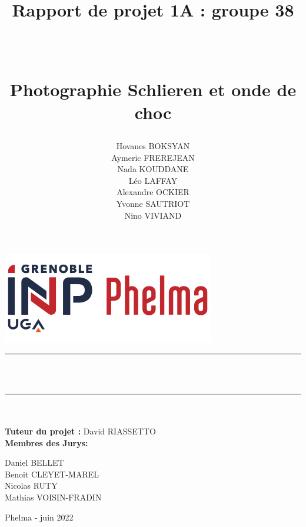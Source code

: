 \documentclass[12 pt, a4paper]{report}
\title{\begin{large} Rapport de projet 1A : groupe 38 \end{large}\\ [3ex]
\begin{Large}
	\textbf{Photographie Schlieren et onde de choc}
\end{Large}}
\author{Hovanes BOKSYAN \\
		Aymeric FREREJEAN \\
		Nada KOUDDANE \\
		Léo LAFFAY \\
		Alexandre OCKIER \\
		Yvonne SAUTRIOT \\
		Nino VIVIAND}
\newcommand{\tutor}{\textbf{Tuteur du projet :} David RIASSETTO}
\newcommand{\HRule}{\rule{\linewidth}{0.2mm}}
\begin{document}
	\begin{spacing}{1.15}
		\makeatletter
			\begin{titlepage}
				\includegraphics[scale = 0.5]{logo.jpeg}
				\vspace{1.5cm}
				\vfill
				\begin{center}
					\HRule \\ [2ex]
					{\@title }\\
					\HRule \\ [3ex]
					{\@author}\\ [5ex]
					{\tutor}\\[7ex]
					\textbf{Membres des Jurys:}\\
					\begin{multicols}{2}
						Daniel BELLET\\
						Benoit CLEYET-MAREL\\
						\columnbreak
						Nicolas RUTY\\
						Mathias VOISIN-FRADIN
					\end{multicols}
				\vfill
				\end{center}
			\raggedleft\vfill{Phelma - juin 2022}
			\end{titlepage}
		\makeatother
	\newpage
	\thispagestyle{empty}
	\addtocounter{page}{1}
	\tableofcontents
	\newpage
	\cleardoublepage
	\listoffigures
	\cleardoublepage
	\listoftables
	\newpage
	\fancyhf{}
	\renewcommand{\footrulewidth}{0.4pt}
	\rfoot{\thepage}
	
	\newpage
	
	\newpage
	
	\newpage
	\newpage
	
	\newpage
	
	\newpage
	
	
	\end{spacing}
\end{document}
